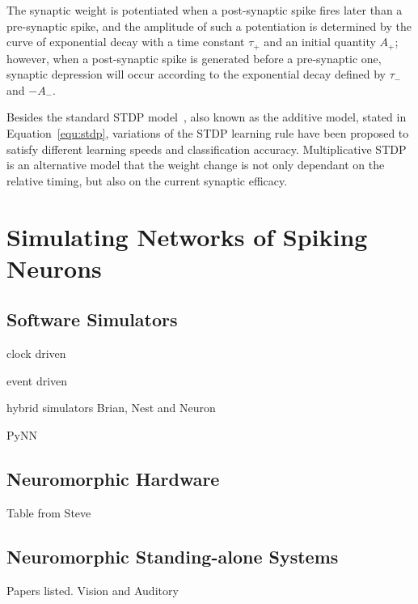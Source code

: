 The synaptic weight is potentiated when a post-synaptic spike fires later than a pre-synaptic spike, and the amplitude of such a potentiation is determined by the curve of exponential decay with a time constant $\tau_+$ and an initial quantity $A_+$;
however, when a post-synaptic spike is generated before a pre-synaptic one, synaptic depression will occur according to the exponential decay defined by $\tau_-$ and $-A_-$.

Besides the standard STDP model~\cite{song2000competitive}, also known as the additive model, stated in Equation~\ref{equ:stdp}, variations of the STDP learning rule have been proposed to satisfy different learning speeds and classification accuracy.
Multiplicative STDP~\cite{van2000stable} is an alternative model that the weight change is not only dependant on the relative timing, but also on the current synaptic efficacy.


\section{Simulating Networks of Spiking Neurons}
\label{sec:snn_sim}
\subsection{Software Simulators}
clock driven

event driven

hybrid simulators Brian, Nest and Neuron

PyNN
\subsection{Neuromorphic Hardware}
Table from Steve
\subsection{Neuromorphic Standing-alone Systems}
Papers listed.
Vision and Auditory
\label{sec:morph}


